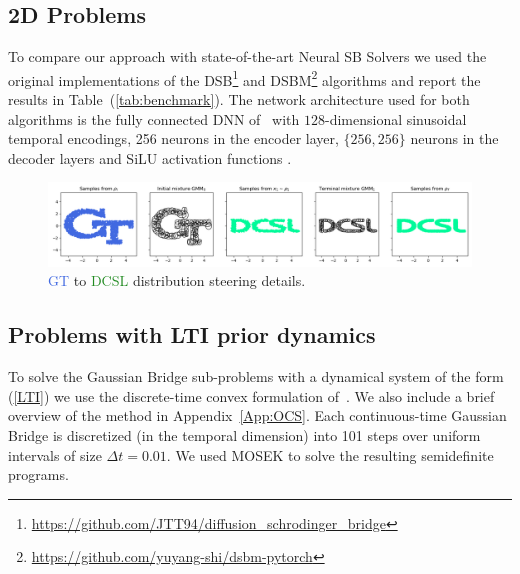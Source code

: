 \documentclass[twoside]{article}
\renewcommand{\eqref}[1]{(\ref{#1})}
\begin{document}
\subsection{2D Problems}

To compare our approach with state-of-the-art Neural SB Solvers we used the original implementations of the DSB\footnote{\url{https://github.com/JTT94/diffusion_schrodinger_bridge}} \citep{de2021diffusion} and DSBM\footnote{\url{https://github.com/yuyang-shi/dsbm-pytorch}} \citep{shi2023diffusion} algorithms and report the results in 
Table~\eqref{tab:benchmark}. 
%
The network architecture used for both algorithms is the fully connected DNN 
of~\cite{de2021diffusion} with $128$-dimensional sinusoidal temporal encodings, 256 neurons in the encoder layer, $\{256, 256\}$ neurons in the decoder layers and SiLU activation functions \citep{hendrycks2016gaussian}.
%
\begin{figure}[htb]
    \centering
    \includegraphics[width=1.\linewidth]{figures/GT2DCSL_noisy_comparison.png}
    \caption{\textcolor{RoyalBlue}{GT} to \textcolor{ForestGreen}{DCSL} distribution steering details.}
    \label{fig:AI2STAT_details}
\end{figure}
%

\subsection{Problems with LTI prior dynamics}

To solve the Gaussian Bridge sub-problems with a dynamical system of the form \eqref{LTI} we use the discrete-time convex formulation 
of~\cite{rapakoulias2023discrete}. 
We also include a brief overview of the method in Appendix~\ref{App:OCS}. 
Each continuous-time Gaussian Bridge is discretized (in the temporal dimension) into 101 steps over uniform intervals of size $\Delta t = 0.01$. 
We used MOSEK \citep{aps2020mosek} to solve the resulting semidefinite programs. 

\end{document}
